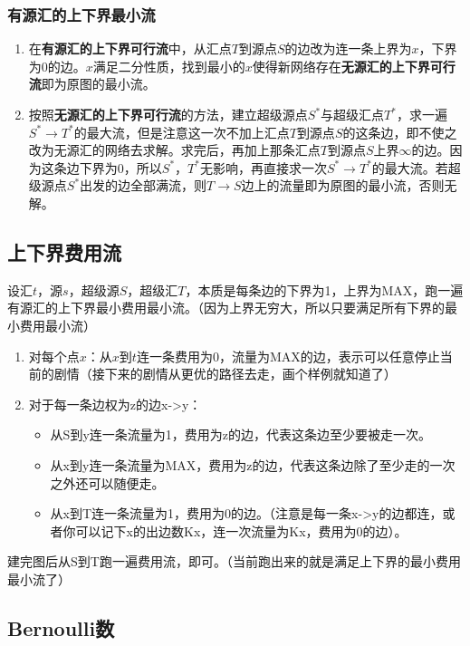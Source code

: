 \documentclass[landscape,twocolumn,a4paper]{article}
\begin{document}
	\subsubsection*{有源汇的上下界最小流}
	\begin{enumerate}
		\item 在\textbf{有源汇的上下界可行流}中，从汇点$T$到源点$S$的边改为连一条上界为$x$，下界为$0$的边。$x$满足二分性质，找到最小的$x$使得新网络存在\textbf{无源汇的上下界可行流}即为原图的最小流。
		\item 按照\textbf{无源汇的上下界可行流}的方法，建立超级源点$S^*$与超级汇点$T^*$，求一遍$S^* \rightarrow T^*$的最大流，但是注意这一次不加上汇点$T$到源点$S$的这条边，即不使之改为无源汇的网络去求解。求完后，再加上那条汇点$T$到源点$S$上界$\infty$的边。因为这条边下界为$0$，所以$S^*$，$T^*$无影响，再直接求一次$S^* \rightarrow T^*$的最大流。若超级源点$S^*$出发的边全部满流，则$T \rightarrow S$边上的流量即为原图的最小流，否则无解。
	\end{enumerate}

	\subsection{上下界费用流}
	\noindent 设汇$t$，源$s$，超级源$S$，超级汇$T$，本质是每条边的下界为1，上界为MAX，跑一遍有源汇的上下界最小费用最小流。（因为上界无穷大，所以只要满足所有下界的最小费用最小流）

	\begin{enumerate}
		\item 对每个点$x$：从$x$到$t$连一条费用为0，流量为MAX的边，表示可以任意停止当前的剧情（接下来的剧情从更优的路径去走，画个样例就知道了）
		\item 对于每一条边权为z的边x->y：

		\begin{itemize}
			\item 从S到y连一条流量为1，费用为z的边，代表这条边至少要被走一次。
			\item 从x到y连一条流量为MAX，费用为z的边，代表这条边除了至少走的一次之外还可以随便走。
			\item 从x到T连一条流量为1，费用为0的边。（注意是每一条x->y的边都连，或者你可以记下x的出边数Kx，连一次流量为Kx，费用为0的边）。

		\end{itemize}
	\end{enumerate}
	建完图后从S到T跑一遍费用流，即可。（当前跑出来的就是满足上下界的最小费用最小流了）

	\subsection{Bernoulli数}
	
\end{document}
